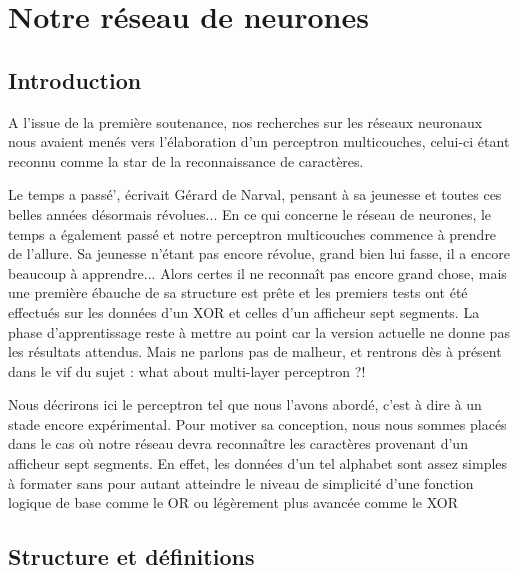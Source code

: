 \documentclass[a4paper,12pt]{report}
\begin{document}




\chapter{Notre r\'eseau de neurones} %
\label{cha:notre_reseau_de_neurones}

\section{Introduction} %
\label{subsec:introduction}
A l'issue de la premi\`ere soutenance, nos recherches sur les r\'eseaux
neuronaux nous avaient men\'es vers l'\'elaboration d'un perceptron
multicouches, celui-ci \'etant reconnu comme la star de la
reconnaissance de caract\`eres.

Le temps a pass\'e', \'ecrivait G\'erard de Narval, pensant \`a sa jeunesse
et toutes ces belles ann\'ees d\'esormais r\'evolues... En ce qui
concerne le r\'eseau de neurones, le temps a \'egalement pass\'e et
notre perceptron multicouches commence \`a prendre de l'allure. Sa
jeunesse n'\'etant pas encore r\'evolue, grand bien lui fasse, il a
encore beaucoup \`a apprendre... Alors
certes il ne reconna\^it pas encore grand chose, mais une premi\`ere
\'ebauche de sa structure est pr\^ete et les premiers tests ont \'et\'e
effectu\'es sur les donn\'ees d'un XOR et celles d'un afficheur sept
segments. La phase d'apprentissage reste \`a mettre au point car la
version actuelle ne donne pas les r\'esultats attendus. Mais ne parlons
pas de malheur, et rentrons d\`es \`a pr\'esent dans le vif du sujet : what about
multi-layer perceptron ?! 

Nous d\'ecrirons ici le perceptron tel que nous l'avons abord\'e, c'est \`a
dire \`a un stade encore exp\'erimental. Pour motiver sa conception,
nous nous sommes plac\'es dans le cas o\`u notre r\'eseau devra
reconna\^itre les caract\`eres provenant d'un afficheur sept
segments. En effet, les donn\'ees d'un tel alphabet sont assez simples
\`a formater sans pour autant atteindre le niveau de simplicit\'e d'une
fonction logique de base comme le OR ou l\'eg\`erement plus avanc\'ee
comme le XOR

\pagebreak
\section{Structure et d\'efinitions} %
\label{subsec:structure_et_definitions}
\end{document}
